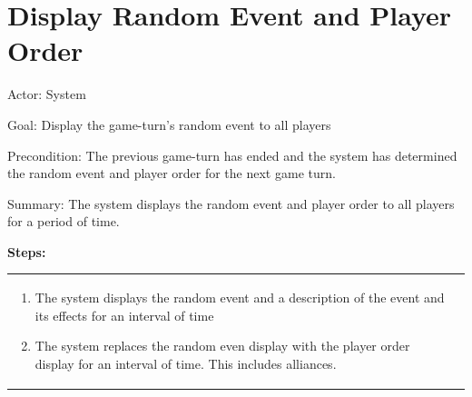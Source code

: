 \documentclass{article}
\newenvironment{al}
{\begin{description}[leftmargin=!,labelwidth=\widthof{\bfseries Preconditions:}]}
{\end{description}}
\newcounter{twocoli}
\newenvironment{twocol}
{ \setcounter{twocoli}{1}
  \begin{tabular}{ p{0.45\textwidth} p{0.43\textwidth}} }
{ \end{tabular} }
\begin{document}
\section{Display Random Event and Player Order}
\begin{al}
	\item[Actor:] System 
	\item[Goal:] Display the game-turn's random event to all players
	\item[Precondition:] The previous game-turn has ended and the system has
                         determined the random event and player order for the
                         next game turn.
	\item[Summary:] The system displays the random event and player order to all
                    players for a period of time.
\end{al}
\textbf{Steps:} \\
\begin{twocol}
	\begin{enumerate}
  \item The system displays the random event and a description of the event and its effects 
        for an interval of time
  \item The system replaces the random even display with the player order display for an 
        interval of time. This includes alliances.
	\end{enumerate}
\end{twocol}
\end{document}
